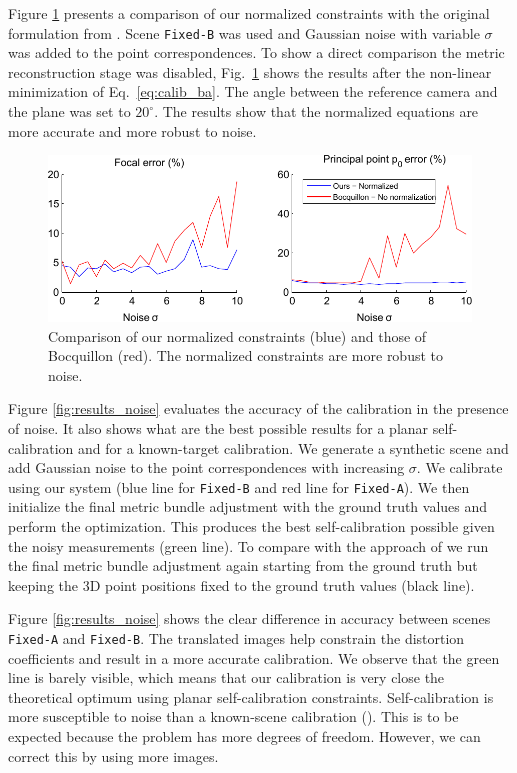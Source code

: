 \documentclass[10pt,twocolumn,letterpaper]{article}
\begin{document}
Figure \ref{fig:results_no_norm} presents a comparison of our normalized constraints with the original formulation from \cite{bocquillon2006}. Scene \texttt{Fixed-B} was used and Gaussian noise with variable $\sigma$ was added  to the point correspondences. To show a direct comparison the metric reconstruction stage was disabled, Fig.~\ref{fig:results_no_norm} shows the results after the non-linear minimization of Eq.~\eqref{eq:calib_ba}. The angle between the reference camera and the plane was set to $20^\circ$. The results show that the normalized equations are more accurate and more robust to noise.

\begin{figure}
\centering
\includegraphics[width=\linewidth]{images/resultsNoNorm.pdf}
\caption{Comparison of our normalized constraints (blue) and those of Bocquillon \cite{bocquillon2006} (red). The normalized constraints are more robust to noise.}
\label{fig:results_no_norm}
\end{figure}

Figure \ref{fig:results_noise} evaluates the accuracy of the calibration in the presence of noise. It also shows what are the best possible results for a planar self-calibration and for a known-target calibration. We generate a synthetic scene and add Gaussian noise to the point correspondences with increasing $\sigma$. We calibrate using our system (blue line for \texttt{Fixed-B} and red line for \texttt{Fixed-A}). We then initialize the final metric bundle adjustment with the ground truth values and perform the optimization. This produces the best self-calibration possible given the noisy measurements (green line). To compare with the approach of \cite{zhang1999} we run the final metric bundle adjustment again starting from the ground truth but keeping the 3D point positions fixed to the ground truth values (black line). 

Figure \ref{fig:results_noise} shows the clear difference in accuracy between scenes \texttt{Fixed-A} and \texttt{Fixed-B}. The translated images help constrain the distortion coefficients and result in a more accurate calibration. We observe that the green line is barely visible, which means that our calibration is very close the theoretical optimum using planar self-calibration constraints. Self-calibration is more susceptible to noise than a known-scene calibration (\eg \cite{zhang1999}). This is to be expected because the problem has more degrees of freedom. However, we can correct this by using more images.
\end{document}
